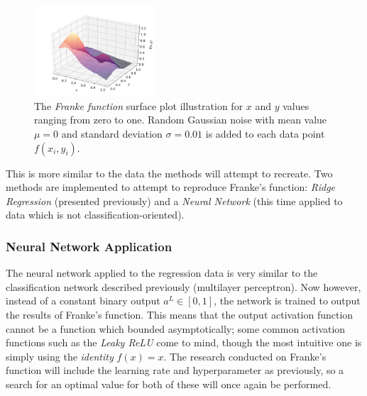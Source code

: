         \begin{figure}[H]
        	\centering
        	\includegraphics[width = 0.4\textwidth]{figures/Franke_noise.png}
        	\caption{The \textit{Franke function} surface plot illustration for $x$ and $y$ values ranging from zero to one. Random Gaussian noise with mean value $\mu=0$ and standard deviation $\sigma=0.01$ is added to each data point $f(x_i,y_i)$.}
        	\label{fig:frankesfunction}
        \end{figure}
        This is more similar to the data the methods will attempt to recreate. Two methods are implemented to attempt to reproduce Franke's function: \textit{Ridge Regression} (presented previously) and a \textit{Neural Network} (this time applied to data which is not classification-oriented).
        \subsubsection{Neural Network Application}
            The neural network applied to the regression data is very similar to the classification network described previously (multilayer perceptron). Now however, instead of a constant binary output $a^L\in[0,1]$, the network is trained to output the results of Franke's function. This means that the output activation function cannot be a function which bounded asymptotically; some common activation functions such as the \textit{Leaky ReLU} come to mind, though the most intuitive one is simply using the \textit{identity} $f(x)=x$. The research conducted on Franke's function will include the learning rate and hyperparameter as previously, so a search for an optimal value for both of these will once again be performed.
